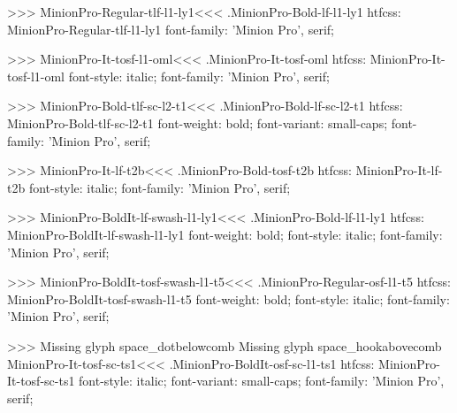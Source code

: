 {>>>
\<MinionPro-Regular-tlf-l1-ly1\><<<
.MinionPro-Bold-lf-l1-ly1
htfcss:  MinionPro-Regular-tlf-l1-ly1  font-family: 'Minion Pro', serif;

>>>
\<MinionPro-It-tosf-l1-oml\><<<
.MinionPro-It-tosf-oml
htfcss:  MinionPro-It-tosf-l1-oml  font-style: italic; font-family: 'Minion Pro', serif;

>>>
\<MinionPro-Bold-tlf-sc-l2-t1\><<<
.MinionPro-Bold-lf-sc-l2-t1
htfcss:  MinionPro-Bold-tlf-sc-l2-t1  font-weight: bold; font-variant: small-caps; font-family: 'Minion Pro', serif;

>>>
\<MinionPro-It-lf-t2b\><<<
.MinionPro-Bold-tosf-t2b
htfcss:  MinionPro-It-lf-t2b  font-style: italic; font-family: 'Minion Pro', serif;

>>>
\<MinionPro-BoldIt-lf-swash-l1-ly1\><<<
.MinionPro-Bold-lf-l1-ly1
htfcss:  MinionPro-BoldIt-lf-swash-l1-ly1  font-weight: bold; font-style: italic; font-family: 'Minion Pro', serif;

>>>
\<MinionPro-BoldIt-tosf-swash-l1-t5\><<<
.MinionPro-Regular-osf-l1-t5
htfcss:  MinionPro-BoldIt-tosf-swash-l1-t5  font-weight: bold; font-style: italic; font-family: 'Minion Pro', serif;

>>>
Missing glyph	space_dotbelowcomb
Missing glyph	space_hookabovecomb
\<MinionPro-It-tosf-sc-ts1\><<<
.MinionPro-BoldIt-osf-sc-l1-ts1
htfcss:  MinionPro-It-tosf-sc-ts1  font-style: italic; font-variant: small-caps; font-family: 'Minion Pro', serif;

}
